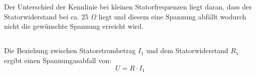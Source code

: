 \chapter{}\label{ex:aufg7}
%
\section{}\label{sec:aufg7a}

\section{}\label{sec:aufg7b}
Der Unterschied der Kennlinie bei kleinen Statorfrequenzen liegt daran, dass der Statorwiderstand bei ca. 25 $\Omega$ liegt und diesem eine Spannung abfällt wodurch nicht die gewünschte Spannung erreicht wird.
\section{}\label{sec:aufg7c}
Die Beziehung zwischen Statorstrombetrag $I_1$ und dem Statorwiderstand $R_1$ ergibt einen Spannungasabfall von:
\begin{equation}
	U = R \cdot I_1
\end{equation}
\section{}\label{sec:aufg7d}